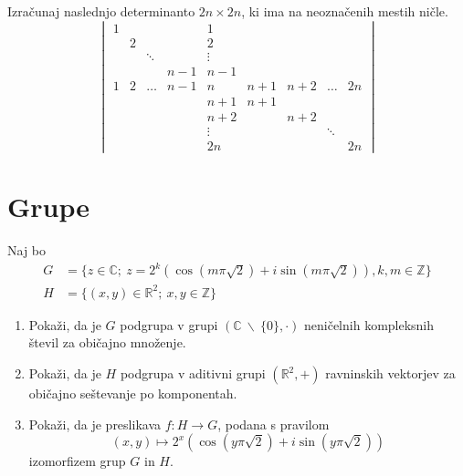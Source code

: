 \documentclass[a4paper,12pt]{article}
\begin{document}
Izračunaj naslednjo determinanto \(2n \times 2n\), ki ima na neoznačenih mestih ničle.
\[
\begin{vmatrix}
 1 &   &   &   & 1 &   &   &   & \\
   & 2 &   &   & 2 &   &   &   & \\
   &   & \ddots  &   & \vdots  &   &   &   & \\
   &   &   & n-1  &  n-1 &   &   &   & \\
 1  & 2  & \dots  & n-1  & n  & n+1  &  n+2 &  \dots & 2n \\
   &   &   &   & n+1  & n+1  &   &   & \\
   &   &   &   &  n+2 &   & n+2  &   & \\
   &   &   &   &  \vdots &   &   &  \ddots & \\
   &   &   &   & 2n  &   &   &   & 2n
\end{vmatrix}
\]
%
%

\section*{Grupe}

Naj bo
\begin{align*}
    G &= \{ z \in \mathbb{C};\  z =2^k(\cos(m\pi\sqrt{2})+i\sin(m\pi\sqrt{2})), k,m \in \mathbb{Z}\} \\
    H &= \{(x,y)\in\mathbb{R}^2;\ x,y \in \mathbb{Z}\}
\end{align*}
\begin{enumerate}
\item
Pokaži, da je \(G\) podgrupa v grupi $(\mathbb{C} \ \backslash\ \{0\},\cdot)$
neničelnih kompleksnih števil za običajno množenje.

\item
Pokaži, da je \(H\) podgrupa v aditivni grupi $(\mathbb{R}^2, +)$
ravninskih vektorjev za običajno seštevanje po komponentah.

\item
Pokaži, da je preslikava \(f:H\to G\), podana s pravilom
\[
(x,y) \mapsto 2^x(\cos(y\pi\sqrt{2}) + i\sin(y\pi\sqrt{2}))
\]
izomorfizem grup \(G\) in \(H\).
\end{enumerate}
\end{document}
